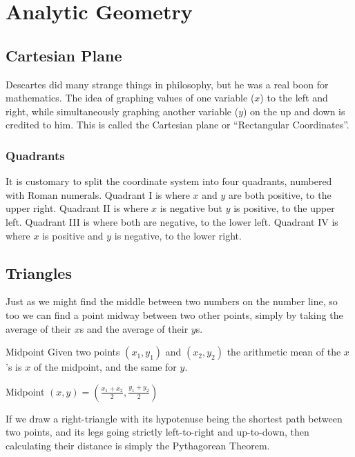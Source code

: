 

\section{Analytic Geometry}\label{sec:AG}




\subsection{Cartesian Plane}
Descartes did many strange things in philosophy, but he was a real boon for mathematics.  The idea
of graphing values of one variable ($x$) to the left and right, while simultaneously graphing another
variable ($y$) on the up and down is credited to him.  This is called the \gls{Cartesian plane} 
or ``Rectangular Coordinates''.

\subsubsection{Quadrants}
It is customary to split the coordinate system into four quadrants, numbered with Roman numerals.
Quadrant I is where $x$ and $y$ are both positive, to the upper right.  Quadrant II is where $x$ is negative
but $y$ is positive, to the upper left.  Quadrant III is where both are negative, to the lower left.  Quadrant
IV is where $x$ is positive and $y$ is negative, to the lower right.

\subsection{Triangles}
Just as we might find the middle between two numbers on the number line, 
so too we can find a point midway 
between two other points, simply by taking the average of their $x$s and the average of their $y$s.

\begin{derivation}{Midpoint}
Given two points $(x_1,y_1)$ and $(x_2,y_2)$ the arithmetic mean of the $x$'s is $x$ of the midpoint,
and the same for $y$.

Midpoint $(x,y)=(\frac{x_1+x_2}{2},\frac{y_1+y_2}{2})$
\end{derivation}

If we draw a right-triangle with its hypotenuse being the shortest path between two points, and its legs going
strictly left-to-right and up-to-down, then calculating their distance is simply the Pythagorean Theorem.

